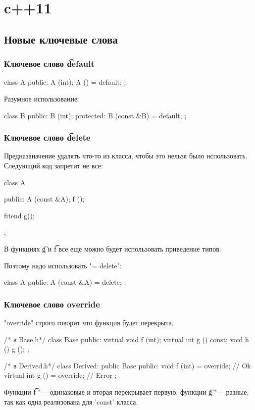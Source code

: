 \chapter{c++11}
\section{Новые ключевые слова}

\subsection{Ключевое слово \t{default}}

\begin{cppcode}
class A {
public:
	A (int);
	A () = default;
};
\end{cppcode}

Разумное использование:
\begin{cppcode}
class B {
public:
	B (int);
protected:
	B (const &B) = default;
};
\end{cppcode}

\subsection{Ключевое слово \t{delete}}

Предназаначение удалять что-то из класса, чтобы это нельзя было использовать.
Следующий код запретит не все:
\begin{cppcode}
class A {
public:
	A (const &A);
	f ();

	friend g();
};
\end{cppcode}
В функциях \t{g} и \t{f} все еще можно будет использовать приведение типов.

Поэтому надо использовать \cpp"= delete":
\begin{cppcode}
class A {
public:
	A (const &A) = delete;
};
\end{cppcode}

\subsection{Ключевое слово override}

\cpp"override" строго говорит что функция будет перекрыта.

\begin{cppcode}
/* в Base.h*/
class Base {
public:
	virtual void f (int);
	virtual int g () const;
	void h () {
		g ();
	}
};

/* в Derived.h*/
class Derived: public Base {
public:
	void f (int) = override; // Ok
	virtual int g () = override; // Error
};
\end{cppcode}
Функции \t{f} "--- одинаковые и вторая перекрывает первую, функции \t{g} "--- разные, так как одна реализована для \cpp'const' класса.

